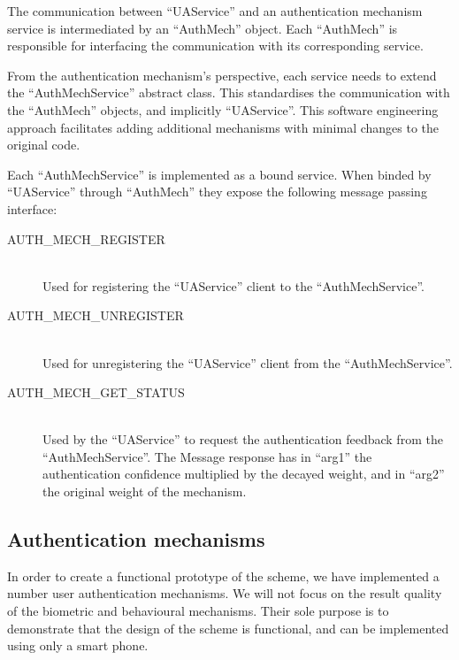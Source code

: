 The communication between ``UAService'' and an authentication mechanism service is intermediated by an ``AuthMech'' object. Each ``AuthMech'' is responsible for interfacing the communication with its corresponding service. 

From the authentication mechanism's perspective, each service needs to extend the ``AuthMechService'' abstract class. This standardises the communication with the ``AuthMech'' objects, and implicitly ``UAService''. This software engineering approach facilitates adding additional mechanisms with minimal changes to the original code.

Each ``AuthMechService'' is implemented as a bound service. When binded by ``UAService'' through ``AuthMech'' they expose the following message passing interface:
\begin{description}
  \item[AUTH\_MECH\_REGISTER] \hfill \\
  Used for registering the ``UAService'' client to the ``AuthMechService''.
  
  \item[AUTH\_MECH\_UNREGISTER] \hfill \\
  Used for unregistering the ``UAService'' client from the ``AuthMechService''.
  
  \item[AUTH\_MECH\_GET\_STATUS] \hfill \\
  Used by the ``UAService'' to request the authentication feedback from the ``AuthMechService''. The Message response has in ``arg1'' the authentication confidence multiplied by the decayed weight, and in ``arg2'' the original weight of the mechanism.
  \end{description}

\subsection{Authentication mechanisms}
\label{implauthmech}
In order to create a functional prototype of the scheme, we have implemented a number user authentication mechanisms. We will not focus on the result quality of the biometric and behavioural mechanisms. Their sole purpose is to demonstrate that the design of the scheme is functional, and can be implemented using only a smart phone.

